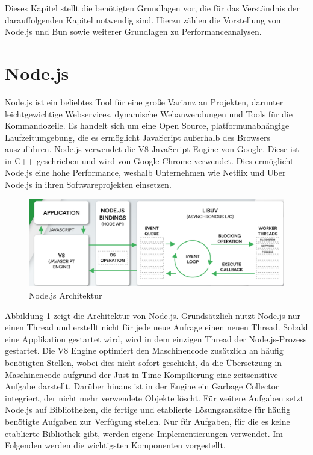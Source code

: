  \label{ch:foundations}
Dieses Kapitel stellt die benötigten Grundlagen vor, die für das Verständnis der darauffolgenden Kapitel notwendig sind. Hierzu zählen die Vorstellung von Node.js und Bun sowie weiterer Grundlagen zu Performanceanalysen.

\section{Node.js} \label{sec:foundations-Node.js}
Node.js ist ein beliebtes Tool für eine große Varianz an Projekten, darunter leichtgewichtige Webservices, dynamische Webanwendungen und Tools für die Kommandozeile. Es handelt sich um eine Open Source, platformunabhängige Laufzeitumgebung, die es ermöglicht JavaScript außerhalb des Browsers auszuführen. Node.js verwendet die V8 JavaScript Engine von Google. Diese ist in C++ geschrieben und wird von Google Chrome verwendet. Dies ermöglicht Node.js eine hohe Performance, weshalb Unternehmen wie Netflix und Uber Node.js in ihren Softwareprojekten einsetzen.\cite{OpenJSFoundation.2022}\\

\begin{figure}[h]
	\centering
	\includegraphics[width=\linewidth]{./images/NodeJsArchitecture}
	\caption[Node.js Architektur]{Node.js Architektur \cite{Kaneriya.2022}}
	\label{fig:nodejsArchitecture}
\end{figure}
 
\noindent
Abbildung \ref{fig:nodejsArchitecture} zeigt die Architektur von Node.js. Grundsätzlich nutzt Node.js nur einen Thread und erstellt nicht für jede neue Anfrage einen neuen Thread. Sobald eine Applikation gestartet wird, wird in dem einzigen Thread der Node.js-Prozess gestartet. Die V8 Engine optimiert den Maschinencode zusätzlich an häufig benötigten Stellen, wobei dies nicht sofort geschieht, da die Übersetzung in Maschinencode aufgrund der Just-in-Time-Kompilierung eine zeitsensitive Aufgabe darstellt. Darüber hinaus ist in der Engine ein Garbage Collector integriert, der nicht mehr verwendete Objekte löscht.\cite{Springer.2022} \newline 
Für weitere Aufgaben setzt Node.js auf Bibliotheken, die fertige und etablierte Lösungsansätze für häufig benötigte Aufgaben zur Verfügung stellen. Nur für Aufgaben, für die es keine etablierte Bibliothek gibt, werden eigene Implementierungen verwendet. Im Folgenden werden die wichtigsten Komponenten vorgestellt.\cite{Springer.2022}\\

